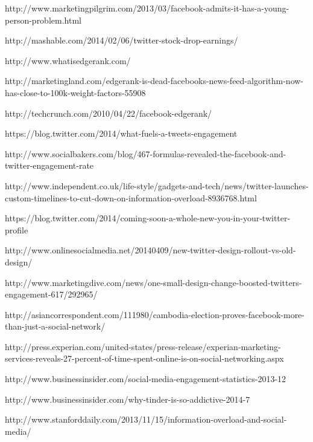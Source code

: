 \begin{thebibliography}{9}

http://www.marketingpilgrim.com/2013/03/facebook-admits-it-has-a-young-person-problem.html

http://mashable.com/2014/02/06/twitter-stock-drop-earnings/

http://www.whatisedgerank.com/

http://marketingland.com/edgerank-is-dead-facebooks-news-feed-algorithm-now-has-close-to-100k-weight-factors-55908

http://techcrunch.com/2010/04/22/facebook-edgerank/


https://blog.twitter.com/2014/what-fuels-a-tweets-engagement

http://www.socialbakers.com/blog/467-formulas-revealed-the-facebook-and-twitter-engagement-rate


http://www.independent.co.uk/life-style/gadgets-and-tech/news/twitter-launches-custom-timelines-to-cut-down-on-information-overload-8936768.html

https://blog.twitter.com/2014/coming-soon-a-whole-new-you-in-your-twitter-profile

http://www.onlinesocialmedia.net/20140409/new-twitter-design-rollout-vs-old-design/

http://www.marketingdive.com/news/one-small-design-change-boosted-twitters-engagement-617/292965/


http://asiancorrespondent.com/111980/cambodia-election-proves-facebook-more-than-just-a-social-network/

http://press.experian.com/united-states/press-release/experian-marketing-services-reveals-27-percent-of-time-spent-online-is-on-social-networking.aspx

http://www.businessinsider.com/social-media-engagement-statistics-2013-12

http://www.businessinsider.com/why-tinder-is-so-addictive-2014-7

http://www.stanforddaily.com/2013/11/15/information-overload-and-social-media/


\end{thebibliography}
